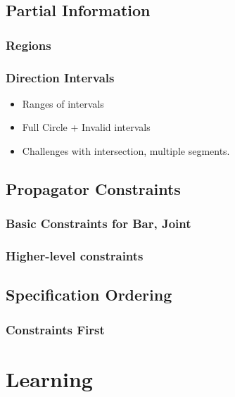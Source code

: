 \documentclass[11pt]{article}
\begin{document}
\subsection{Partial Information}
\label{sec-4-2}
\subsubsection{Regions}
\label{sec-4-2-1}
\subsubsection{Direction Intervals}
\label{sec-4-2-2}

\begin{itemize}
\item Ranges of intervals
\item Full Circle + Invalid intervals
\item Challenges with intersection, multiple segments.
\end{itemize}
\subsection{Propagator Constraints}
\label{sec-4-3}
\subsubsection{Basic Constraints for Bar, Joint}
\label{sec-4-3-1}
\subsubsection{Higher-level constraints}
\label{sec-4-3-2}
\subsection{Specification Ordering}
\label{sec-4-4}
\subsubsection{Constraints First}
\label{sec-4-4-1}
\section{Learning}
\label{sec-5}
\end{document}

